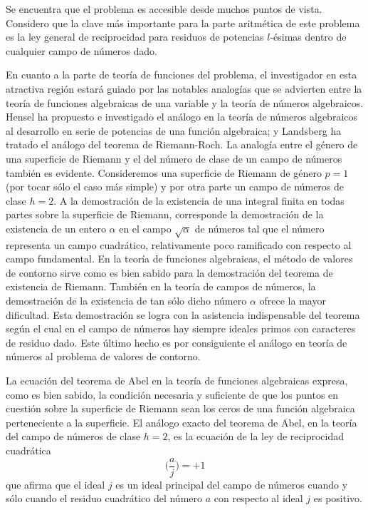 \documentclass[a4paper, 12pt]{article}
\begin{document}
Se encuentra que el problema es accesible desde muchos puntos de vista. Considero que la clave más importante para la parte aritmética de este problema es la ley general de reciprocidad para residuos de potencias $l$-ésimas dentro de cualquier campo de números dado.

En cuanto a la parte de teoría de funciones del problema, el investigador en esta atractiva región estará guiado por las notables analogías que se advierten entre la teoría de funciones algebraicas de una variable y la teoría de números algebraicos. Hensel ha propuesto e investigado el análogo en la teoría de números algebraicos al desarrollo en serie de potencias de una función algebraica; y Landsberg ha tratado el análogo del teorema de Riemann-Roch. La analogía entre el género de una superficie de Riemann y el del número de clase de un campo de números también es evidente. Consideremos una superficie de Riemann de género $p = 1$ (por tocar sólo el caso más simple) y por otra parte un campo de números de clase $h = 2$. A la demostración de la existencia de una integral finita en todas partes sobre la superficie de Riemann, corresponde la demostración de la existencia de un entero $\alpha$ en el campo $\sqrt{\alpha}$ de números tal que el número representa un campo cuadrático, relativamente poco ramificado con respecto al campo fundamental. En la teoría de funciones algebraicas, el método de valores de contorno sirve como es bien sabido para la demostración del teorema de existencia de Riemann. También en la teoría de campos de números, la demostración de la existencia de tan sólo dicho número $\alpha$ ofrece la mayor dificultad. Esta demostración se logra con la asistencia indispensable del teorema según el cual en el campo de números hay siempre ideales primos con caracteres de residuo dado. Este último hecho es por consiguiente el análogo en teoría de números al problema de valores de contorno.

La ecuación del teorema de Abel en la teoría de funciones algebraicas expresa, como es bien sabido, la condición necesaria y suficiente de que los puntos en cuestión sobre la superficie de Riemann sean los ceros de una función algebraica perteneciente a la superficie. El análogo exacto del teorema de Abel, en la teoría del campo de números de clase $h = 2$, es la ecuación de la ley de reciprocidad cuadrática
$$\bigg(\frac{a}{j}\bigg)=+1
$$
que afirma que el ideal $j$ es un ideal principal del campo de números cuando y sólo cuando el residuo cuadrático del número $a$ con respecto al ideal $j$ es positivo.
\end{document}
